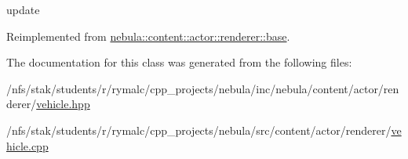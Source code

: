 update 

Reimplemented from \hyperlink{classnebula_1_1content_1_1actor_1_1renderer_1_1base_afcde5bb9124d7a6b81053c15b4322e0e}{nebula::content::actor::renderer::base}.

The documentation for this class was generated from the following files:\begin{DoxyCompactItemize}
\item 
/nfs/stak/students/r/rymalc/cpp\_\-projects/nebula/inc/nebula/content/actor/renderer/\hyperlink{renderer_2vehicle_8hpp}{vehicle.hpp}\item 
/nfs/stak/students/r/rymalc/cpp\_\-projects/nebula/src/content/actor/renderer/\hyperlink{renderer_2vehicle_8cpp}{vehicle.cpp}\end{DoxyCompactItemize}
